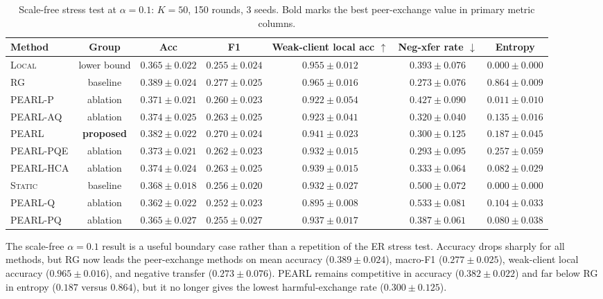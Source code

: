 \documentclass[conference]{IEEEtran}
\begin{document}
\begin{table}[t]
\centering
\caption{Scale-free stress test at $\alpha=0.1$: $K=50$, 150 rounds, 3 seeds. Bold marks the best peer-exchange value in primary metric columns.}
\label{tab:sf_alpha01_results}
\renewcommand{\arraystretch}{1.18}
\setlength{\tabcolsep}{4pt}
\begin{tabular}{lcccccc}
\toprule
\textbf{Method} & \textbf{Group} & \textbf{Acc} & \textbf{F1} & \textbf{Weak-client local acc} $\uparrow$ & \textbf{Neg-xfer rate} $\downarrow$ & \textbf{Entropy} \\
\midrule
\textsc{Local} & lower bound & $0.365\pm0.022$ & $0.255\pm0.024$ & $0.955\pm0.012$ & $0.393\pm0.076$ & $0.000\pm0.000$ \\
\textsc{RG} & baseline & $\mathbf{0.389\pm0.024}$ & $\mathbf{0.277\pm0.025}$ & $\mathbf{0.965\pm0.016}$ & $\mathbf{0.273\pm0.076}$ & $0.864\pm0.009$ \\
\textsc{PEARL-P} & ablation & $0.371\pm0.021$ & $0.260\pm0.023$ & $0.922\pm0.054$ & $0.427\pm0.090$ & $0.011\pm0.010$ \\
\textsc{PEARL-AQ} & ablation & $0.374\pm0.025$ & $0.263\pm0.025$ & $0.923\pm0.041$ & $0.320\pm0.040$ & $0.135\pm0.016$ \\
\textsc{PEARL} & \textbf{proposed} & $0.382\pm0.022$ & $0.270\pm0.024$ & $0.941\pm0.023$ & $0.300\pm0.125$ & $0.187\pm0.045$ \\
\textsc{PEARL-PQE} & ablation & $0.373\pm0.021$ & $0.262\pm0.023$ & $0.932\pm0.015$ & $0.293\pm0.095$ & $0.257\pm0.059$ \\
\textsc{PEARL-HCA} & ablation & $0.374\pm0.024$ & $0.263\pm0.025$ & $0.939\pm0.015$ & $0.333\pm0.064$ & $0.082\pm0.029$ \\
\textsc{Static} & baseline & $0.368\pm0.018$ & $0.256\pm0.020$ & $0.932\pm0.027$ & $0.500\pm0.072$ & $0.000\pm0.000$ \\
\textsc{PEARL-Q} & ablation & $0.362\pm0.022$ & $0.252\pm0.023$ & $0.895\pm0.008$ & $0.533\pm0.081$ & $0.104\pm0.033$ \\
\textsc{PEARL-PQ} & ablation & $0.365\pm0.027$ & $0.255\pm0.027$ & $0.937\pm0.017$ & $0.387\pm0.061$ & $0.080\pm0.038$ \\
\bottomrule
\end{tabular}
\end{table}

The scale-free $\alpha=0.1$ result is a useful boundary case rather than a repetition of the ER stress test. Accuracy drops sharply for all methods, but \textsc{RG} now leads the peer-exchange methods on mean accuracy ($0.389\pm0.024$), macro-F1 ($0.277\pm0.025$), weak-client local accuracy ($0.965\pm0.016$), and negative transfer ($0.273\pm0.076$). \textsc{PEARL} remains competitive in accuracy ($0.382\pm0.022$) and far below \textsc{RG} in entropy ($0.187$ versus $0.864$), but it no longer gives the lowest harmful-exchange rate ($0.300\pm0.125$).
\end{document}
